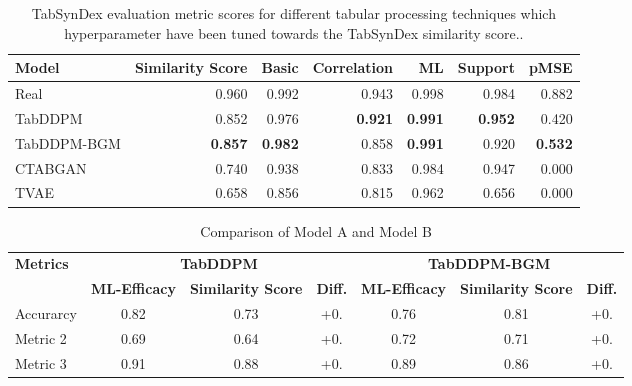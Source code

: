 \begin{table}[h]
	\centering
	\begin{tabular}{lrrrrrr}
		\toprule
		\textbf{Model} & \textbf{Similarity Score} & \textbf{Basic} & \textbf{Correlation} & \textbf{ML}    & \textbf{Support} & \textbf{pMSE}  \\
		\midrule
		Real           & 0.960                     & 0.992          & 0.943                & 0.998          & 0.984            & 0.882          \\
		TabDDPM        & 0.852                     & 0.976          & \textbf{0.921}       & \textbf{0.991} & \textbf{0.952}   & 0.420          \\
		TabDDPM-BGM    & \textbf{0.857}            & \textbf{0.982} & 0.858                & \textbf{0.991} & 0.920            & \textbf{0.532} \\
		CTABGAN        & 0.740                     & 0.938          & 0.833                & 0.984          & 0.947            & 0.000          \\
		TVAE           & 0.658                     & 0.856          & 0.815                & 0.962          & 0.656            & 0.000          \\
		\bottomrule
	\end{tabular}
	\caption[Experiment2-Similarity]{TabSynDex evaluation metric scores for different tabular processing techniques which hyperparameter have been tuned towards the TabSynDex similarity score..}
	\label{tab:exp2-sim}
\end{table}


\begin{table}[h]
	\centering
	\caption{Comparison of Model A and Model B}
	\label{tab:model-comparison}
	\begin{tabular}{|l|ccc|ccc|}
		\toprule
		\multirow{2}{*}{\textbf{Metrics}} & \multicolumn{3}{c|}{\textbf{TabDDPM}} & \multicolumn{3}{c|}{\textbf{TabDDPM-BGM}}                                                                                      \\ \cline{2-7}
		                                  & \textbf{ML-Efficacy}                  & \textbf{Similarity Score}                 & \textbf{Diff.} & \textbf{ML-Efficacy} & \textbf{Similarity Score} & \textbf{Diff.} \\
		\midrule                          
		\multicolumn{1}{|l|}{Accurarcy}    & 0.82                                  & 0.73                                      & +0.            & 0.76                 & 0.81                      & +0.            \\
		\multicolumn{1}{|l|}{Metric 2}    & 0.69                                  & 0.64                                      & +0.            & 0.72                 & 0.71                      & +0.            \\
		\multicolumn{1}{|l|}{Metric 3}    & 0.91                                  & 0.88                                      & +0.            & 0.89                 & 0.86                      & +0.            \\
		\bottomrule
	\end{tabular}
\end{table}


